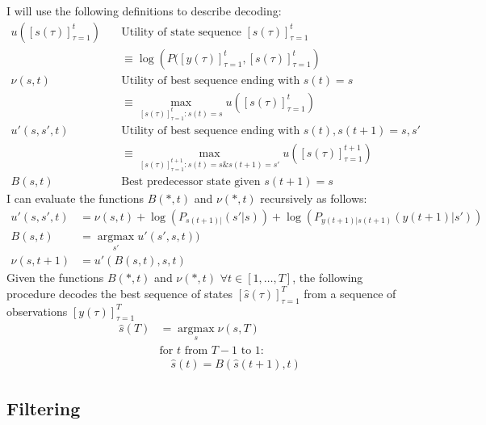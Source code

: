 \documentclass[12pt]{article}
\newcommand{\os}[4]{{\left[ #1(#2) \right]}_{#3}^{#4}} %
\newcommand{\ti}[2]{{#1}{(#2)}}                         %
\newcommand{\ts}[4]{\os{#1}{#2}{#2=#3}{#4}} %
\newcommand{\argmax}{\operatorname*{argmax}}
\begin{document}
I will use the following definitions to describe decoding:
\begin{align*}
  u(\ts{s}{\tau}{1}{t}) & \quad \text{Utility of state sequence }
  \ts{s}{\tau}{1}{t}\\
  & \quad \equiv \log \left( P(\ts{y}{\tau}{1}{t},\ts{s}{\tau}{1}{t} \right)
  \\
  \nu(s,t) & \quad \text{Utility of best sequence ending with }
  \ti{s}{t} = s \\ 
  &  \quad \equiv \max_{\ts{s}{\tau}{1}{t}:\ti{s}{t}=s} u(\ts{s}{\tau}{1}{t}) \\
  u'(s,s',t) & \quad \text{Utility of best sequence ending with }
  \ti{s}{t},\ti{s}{t+1} = s,s' \\
  &  \quad \equiv \max_{\ts{s}{\tau}{1}{t+1}:\ti{s}{t}=s \&\ti{s}{t+1}=s'}
  u(\ts{s}{\tau}{1}{t+1}) \\
  B(s,t) & \quad \text{Best predecessor state given } \ti{s}{t+1}=s   
\end{align*}
I can evaluate the functions $B(*,t)$ and $\nu(*,t)$ recursively as
follows:
\begin{align*}
  u'(s,s',t) &= \nu(s,t) + \log\left( P_{\ti{s}{t+1}|}(s'|s) \right) +
  \log\left( P_{\ti{y}{t+1}|\ti{s}{t+1}}(\ti{y}{t+1}|s') \right) \\
  B(s,t) &= \argmax_{s'} u'(s',s,t)) \\
  \nu(s,t+1) &= u'(B(s,t),s,t)
\end{align*}
Given the functions $B(*,t)$ and $\nu(*,t)$ $\forall
t\in[1,\ldots,T]$, the following procedure decodes the best sequence
of states $ \ts{\hat s}{\tau}{1}{T}$ from a sequence of observations $
\ts{y}{\tau}{1}{T}$
\begin{align*}
  {\ti{{\hat s}}{T}} &= \argmax_s \nu(s,T) \\
  & \text{for } t \text{ from } T-1 \text{ to } 1: \\
  & \quad \ti{\hat s}{t} = B( \ti{\hat s}{t+1},t)
\end{align*}

\subsection{Filtering}
\label{sec:filtering}
\end{document}
